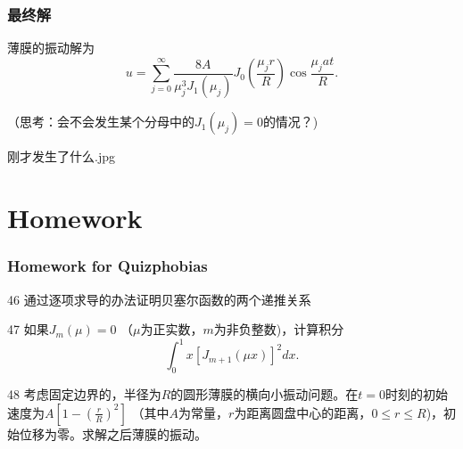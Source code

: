 \documentclass[CJK]{beamer}
\begin{document}
\begin{frame}
  \frametitle{最终解}
  
  薄膜的振动解为
  $$ u = \sum_{j=0}^\infty \frac{8A}{\mu_j^3J_1(\mu_j)}J_0\left( \frac{\mu_jr}{R}\right)\cos\frac{\mu_jat}{R}. $$

  \skiplines

  （思考：会不会发生某个分母中的$J_1(\mu_j)=0$的情况？)
  
\end{frame}


\begin{frame}
  
  \bcenter

  刚才发生了什么.jpg
  \ecenter

\end{frame}


\section{Homework}

\begin{frame}
  \frametitle{Homework for Quizphobias}
  
  \bitem
\item[46]{通过逐项求导的办法证明贝塞尔函数的两个递推关系}
\item[47]{如果$J_m(\mu) = 0$ （$\mu$为正实数，$m$为非负整数)，计算积分
    $$\int_0^1x\left[J_{m+1}(\mu x)\right]^2 dx. $$
}
\item[48]{ 考虑固定边界的，半径为$R$的圆形薄膜的横向小振动问题。在$t=0$时刻的初始速度为$A\left[1-\left(\frac{r}{R}\right)^2\right]$ （其中$A$为常量，$r$为距离圆盘中心的距离，$0\le r\le R$)，初始位移为零。求解之后薄膜的振动。
 }
  \eitem
  
\end{frame}

\ech
\end{document}
